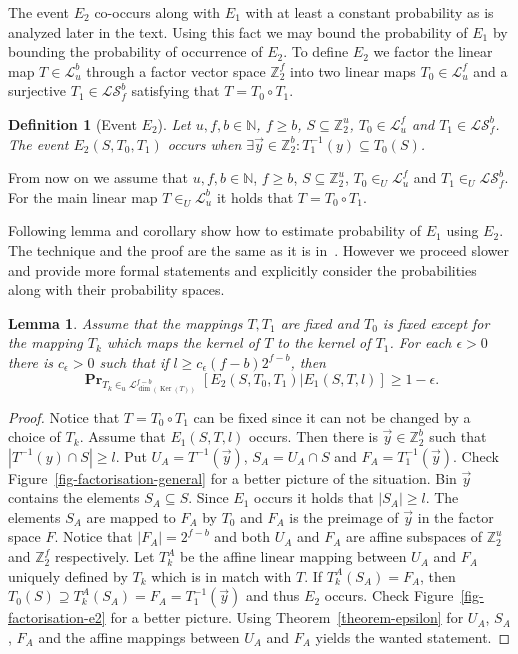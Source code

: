 \documentclass{article}
\newcommand{\vecspace}[2]{\mathbb{Z}_{#1}^{#2}}
\newcommand{\binvecspace}[1]{\vecspace{2}{#1}}
\newcommand{\linearmaps}[2]{\mathcal{L}_{#1}^{#2}}
\newcommand{\surjectivelinearmaps}[2]{\mathcal{LS}_{#1}^{#2}}
\newcommand{\probs}[2]{\operatorname{\mathbf{Pr}}_{{#1}}\left[{#2}\right]}
\newtheorem{lemma}{Lemma}
\newtheorem{definition}{Definition}
\begin{document}
The event $E_2$ co-occurs along with $E_1$ with at least a constant probability as is analyzed later in the text. 
Using this fact we may bound the probability of $E_1$ by bounding the probability of occurrence of $E_2$. 
To define $E_2$ we factor the linear map $T \in \linearmaps{u}{b}$ through a factor vector space $\binvecspace{f}$ into two linear maps $T_0 \in \linearmaps{u}{f}$ and a surjective $T_1 \in \surjectivelinearmaps{f}{b}$ satisfying that $T = T_0 \circ T_1$.
\begin{definition}[Event $E_2$]
Let $u, f, b \in \mathbb{N}$, $f \geq b$, $S \subseteq \binvecspace{u}$, $T_0 \in \linearmaps{u}{f}$ and $T_1 \in \surjectivelinearmaps{f}{b}$.
The event $E_2(S, T_0, T_1)$ occurs when $\exists \vec{y} \in \binvecspace{b} \colon T_1^{-1}(y) \subseteq T_0(S)$.
\end{definition}

From now on we assume that $u, f, b \in \mathbb{N}$, $f \geq b$, $S \subseteq \binvecspace{u}$, $T_0 \in_U \linearmaps{u}{f}$ and $T_1 \in_U \surjectivelinearmaps{f}{b}$. 
For the main linear map $T \in_U \linearmaps{u}{b}$ it holds that $T = T_0 \circ T_1$.

Following lemma and corollary show how to estimate probability of $E_1$ using $E_2$.
The technique and the proof are the same as it is in~\cite{alonetal}.
However we proceed slower and provide more formal statements and explicitly consider the probabilities along with their probability spaces.

\begin{lemma}
\label{lemma-e1-e2}
Assume that the mappings $T, T_1$ are fixed and $T_0$ is fixed except for the mapping $T_k$ which maps the kernel of $T$ to the kernel of $T_1$.
For each $\epsilon > 0$ there is $c_\epsilon > 0$ such that if $l \geq c_\epsilon (f - b)2^{f-b}$, then
\[
\probs{T_k \in_u \linearmaps{\operatorname{dim}(\operatorname{Ker}(T))}{f-b}}{E_2(S, T_0, T_1) | E_1(S, T, l)} \geq 1 - \epsilon.
\]
\end{lemma}
\begin{proof}
Notice that $T = T_0 \circ T_1$ can be fixed since it can not be changed by a choice of $T_k$.
Assume that $E_1(S, T, l)$ occurs. 
Then there is $\vec{y} \in \binvecspace{b}$ such that $|T^{-1}(y) \cap S| \geq l$.
Put $U_A = T^{-1}(\vec{y})$, $S_A = U_A \cap S$ and $F_A = T_1^{-1}(\vec{y})$.
Check Figure~\ref{fig-factorisation-general} for a better picture of the situation.
Bin $\vec{y}$ contains the elements $S_A \subseteq S$.
Since $E_1$ occurs it holds that $|S_A| \geq l$.
The elements $S_A$ are mapped to $F_A$ by $T_0$ and $F_A$ is the preimage of $\vec{y}$ in the factor space $F$.
Notice that $|F_A| = 2^{f-b}$ and both $U_A$ and $F_A$ are affine subspaces of $\binvecspace{u}$ and $\binvecspace{f}$ respectively.
Let $T_k^A$ be the affine linear mapping between $U_A$ and $F_A$ uniquely defined by $T_k$ which is in match with $T$.
If $T_k^A(S_A) = F_A$, then $T_0(S) \supseteq T_k^A(S_A) = F_A = T_1^{-1}(\vec{y})$ and thus $E_2$ occurs.
Check Figure~\ref{fig-factorisation-e2} for a better picture.
Using Theorem~\ref{theorem-epsilon} for $U_A$, $S_A$, $F_A$ and the affine mappings between $U_A$ and $F_A$ yields the wanted statement. 
\end{proof}
\end{document}
